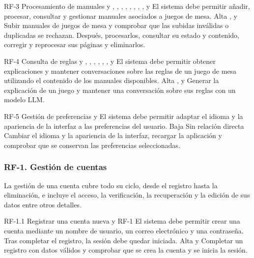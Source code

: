 \requisitoPadre
{RF-3}
{Procesamiento de manuales}
{ y }
{, , ,
, , ,
, ,  y
}
{El sistema debe permitir añadir, procesar, consultar y gestionar manuales
asociados a juegos de mesa.}
{Alta}
{,  y }
{Subir manuales de juegos de mesa y comprobar que las subidas inválidas o duplicadas se
rechazan. Después, procesarlos, consultar su estado y contenido, corregir y
reprocesar sus páginas y eliminarlos.}

\requisitoPadre
{RF-4}
{Consulta de reglas}
{ y }
{, , ,
, , ,
 y }
{El sistema debe permitir obtener explicaciones y mantener conversaciones
sobre las reglas de un juego de mesa utilizando el contenido de los manuales
disponibles.}
{Alta}
{,  y }
{Generar la explicación de un juego y mantener una conversación sobre sus
reglas con un modelo \ac{LLM}.}


\requisitoPadre
{RF-5}
{Gestión de preferencias}
{}
{ y }
{El sistema debe permitir adaptar el idioma y la apariencia de la interfaz a las
preferencias del usuario.}
{Baja}
{Sin relación directa}
{Cambiar el idioma y la apariencia de la interfaz, recargar la aplicación
y comprobar que se conservan las preferencias seleccionadas.}


\subsubsection{RF-1. Gestión de cuentas}

La gestión de una cuenta cubre todo su ciclo, desde el registro hasta la
eliminación, e incluye el acceso, la verificación, la recuperación y la edición
de sus datos entre otros detalles.

\requisitoFuncional
{RF-1.1}
{Registrar una cuenta nueva}
{ y }
{RF-1}
{El sistema debe permitir crear una cuenta mediante un nombre de usuario, un
correo electrónico y una contraseña. Tras completar el registro, la sesión debe
quedar iniciada.}
{Alta}
{ y }
{Completar un registro con datos válidos y comprobar que se crea la cuenta y se
inicia la sesión.}


